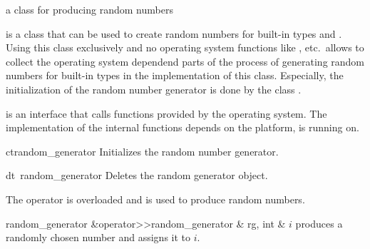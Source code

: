 


\NAME

 \dotfill a class for producing random numbers



\ABSTRACT

 is a class that can be used to create random numbers for built-in types
 and .  Using this class exclusively and no operating system functions like
,  etc.~allows to collect the operating system dependend parts of
the process of generating random numbers for built-in types in the implementation of this class.
Especially, the initialization of the random number generator is done by the class
.



\DESCRIPTION

 is an interface that calls functions provided by the operating system.
The implementation of the internal functions depends on the platform, \LiDIA is running on.



\CONS

\begin{fcode}{ct}{random_generator}{}
  Initializes the random number generator.
\end{fcode}

\begin{fcode}{dt}{~random_generator}{}
  Deletes the random generator object.
\end{fcode}



\ASGN

The operator \code{>>} is overloaded and is used to produce random numbers.

\begin{fcode}{random_generator &}{operator>>}{random_generator & rg, int & $i$}
  produces a randomly chosen number and assigns it to $i$.
\end{fcode}


